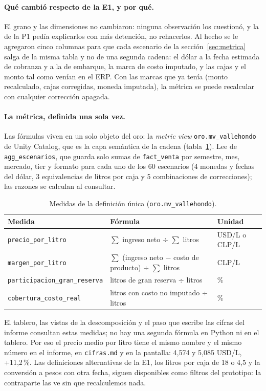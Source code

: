 \paragraph{Qué cambió respecto de la E1, y por qué.} El grano y las dimensiones no cambiaron: ninguna observación los cuestionó, y la de la P1 pedía explicarlos con más detención, no rehacerlos. Al hecho se le agregaron cinco columnas para que cada escenario de la sección~\ref{sec:metrica} salga de la misma tabla y no de una segunda cadena: el dólar a la fecha estimada de cobranza y a la de embarque, la marca de costo imputado, y las cajas y el monto tal como venían en el ERP. Con las marcas que ya tenía (monto recalculado, cajas corregidas, moneda imputada), la métrica se puede recalcular con cualquier corrección apagada.

\paragraph{La métrica, definida una sola vez.} Las fórmulas viven en un solo objeto del oro: la \emph{metric view} \texttt{oro.mv\_vallehondo} de Unity Catalog, que es la capa semántica de la cadena (tabla~\ref{tab:medidas}). Lee de \texttt{agg\_escenarios}, que guarda solo sumas de \texttt{fact\_venta} por semestre, mes, mercado, tier y formato para cada uno de los 60 escenarios (4 monedas y fechas del dólar, 3 equivalencias de litros por caja y 5 combinaciones de correcciones); las razones se calculan al consultar.

\begin{table}[!htbp]
\centering\small
\caption{Medidas de la definición única (\texttt{oro.mv\_vallehondo}).}
\label{tab:medidas}
\begin{tabular}{@{}l l l@{}}
\toprule
\textbf{Medida} & \textbf{Fórmula} & \textbf{Unidad} \\
\midrule
\texttt{precio\_por\_litro} & $\sum$ ingreso neto $\div$ $\sum$ litros & USD/L o CLP/L \\
\texttt{margen\_por\_litro} & $\sum$ (ingreso neto $-$ costo de producto) $\div$ $\sum$ litros & CLP/L \\
\texttt{participacion\_gran\_reserva} & litros de gran reserva $\div$ litros & \% \\
\texttt{cobertura\_costo\_real} & litros con costo no imputado $\div$ litros & \% \\
\bottomrule
\end{tabular}
\end{table}

\noindent El tablero, las vistas de la descomposición y el paso que escribe las cifras del informe consultan estas medidas; no hay una segunda fórmula en Python ni en el tablero. Por eso el precio medio por litro tiene el mismo nombre y el mismo número en el informe, en \texttt{cifras.md} y en la pantalla: 4,574 y 5,085 USD/L, +11,2\,\%. Las definiciones alternativas de la E1, los litros por caja de 18 o 4,5 y la conversión a pesos con otra fecha, siguen disponibles como filtros del prototipo: la contraparte las ve sin que recalculemos nada.
